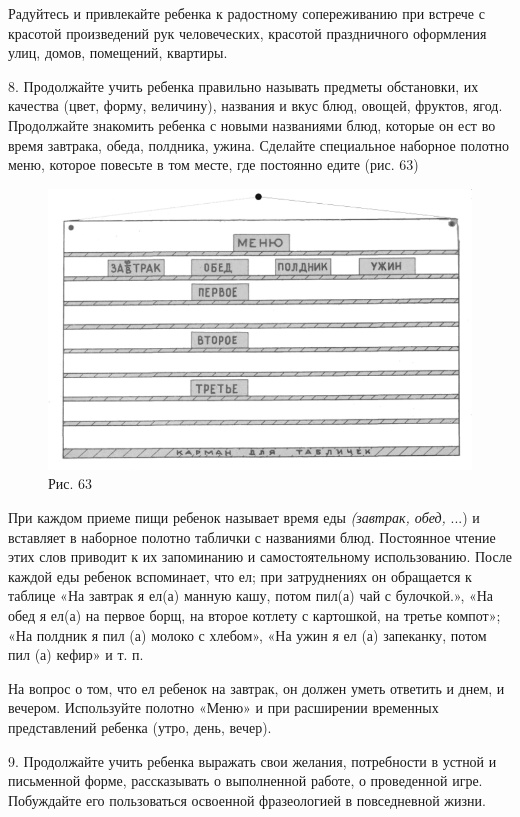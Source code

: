 \documentclass{book}
\renewcommand{\emph}[1]{\textit{#1}}
\begin{document}
Радуйтесь и привлекайте ребенка к радостному сопереживанию при встрече с
красотой произведений рук человеческих, красотой праздничного оформления
улиц, домов, помещений, квартиры.

8. Продолжайте учить ребенка правильно называть предметы обстановки, их
качества (цвет, форму, величину), названия и вкус блюд, овощей, фруктов,
ягод. Продолжайте знакомить ребенка с новыми названиями блюд, которые он
ест во время завтрака, обеда, полдника, ужина. Сделайте специальное
наборное полотно меню, которое повесьте в том месте, где постоянно едите
(рис. 63)

\begin{figure}
\centering
\includegraphics[width=\linewidth]{media/media/image60.png}
\caption*{Рис. 63}
\end{figure}

При каждом приеме пищи ребенок называет время еды \emph{(завтрак, обед,}
...) и вставляет в наборное полотно таблички с названиями блюд.
Постоянное чтение этих слов приводит к их запоминанию и самостоятельному
использованию. После каждой еды ребенок вспоминает, что ел; при
затруднениях он обращается к таблице «На завтрак я ел(а) манную кашу,
потом пил(а) чай с булочкой.», «На обед я ел(а) на первое борщ, на
второе котлету с картошкой, на третье компот»; «На полдник я пил (а)
молоко с хлебом», «На ужин я ел (а) запеканку, потом пил (а) кефир» и т.
п.

На вопрос о том, что ел ребенок на завтрак, он должен уметь ответить и
днем, и вечером. Используйте полотно «Меню» и при расширении временных
представлений ребенка (утро, день, вечер).

9. Продолжайте учить ребенка выражать свои желания, потребности в устной
и письменной форме, рассказывать о выполненной работе, о проведенной
игре. Побуждайте его пользоваться освоенной фразеологией в повседневной
жизни.
\end{document}

